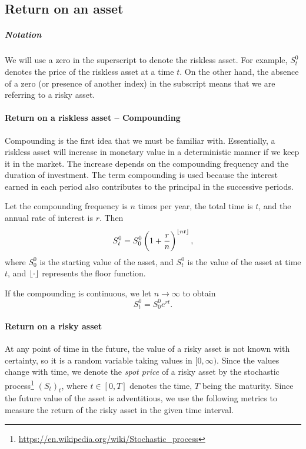 \subsection{Return on an asset}
\label{subsec:intro-assets-return}

\subparagraph{Notation} We will use a zero in the superscript to denote the riskless asset. For example, $ S_t^0 $ denotes the price of the riskless asset at a time $ t $. On the other hand, the absence of a zero (or presence of another index) in the subscript means that we are referring to a risky asset.

\paragraph{Return on a riskless asset -- Compounding}
Compounding is the first idea that we must be familiar with. Essentially, a riskless asset will increase in monetary value in a deterministic manner if we keep it in the market. The increase depends on the compounding frequency and the duration of investment. The term compounding is used because the interest earned in each period also contributes to the principal in the successive periods.

Let the compounding frequency is $ n $ times per year, the total time is $ t $, and the annual rate of interest is $ r $. Then
\begin{equation}
	\label{eq:intro-compounding-discrete}
	S_t^0 = S_0^0 \left(1 + \frac{r}{n} \right)^{\left\lfloor nt\right\rfloor},
\end{equation}
where $ S_0^0 $ is the starting value of the asset, and $ S_t^0 $ is the value of the asset at time $ t $, and $ \left\lfloor\cdot\right\rfloor $ represents the floor function.

If the compounding is continuous, we let $ n \to \infty $ to obtain
\begin{equation}
	\label{eq:intro-compounding-continous}
	S_t^0 = S_0^0 e^{rt}.
\end{equation}


\paragraph{Return on a risky asset}
At any point of time in the future, the value of a risky asset is not known with certainty, so it is a random variable taking values in $ [0, \infty) $. Since the values change with time, we denote the \emph{spot price} of a risky asset by the stochastic process\footnote{\url{https://en.wikipedia.org/wiki/Stochastic_process}} $ (S_t)_t $, where $ t \in [0, T] $ denotes the time, $ T $ being the maturity. Since the future value of the asset is adventitious, we use the following metrics to measure the return of the risky asset in the given time interval.

